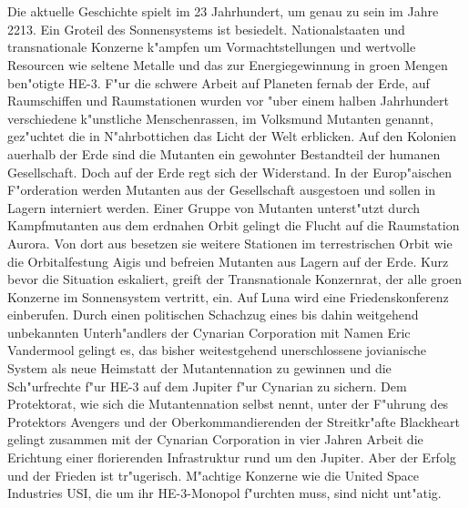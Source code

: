\section{\@introchaptername}

Die aktuelle Geschichte spielt im 23 Jahrhundert, um genau zu sein im Jahre 2213. Ein Gro\3teil des Sonnensystems ist besiedelt. Nationalstaaten und transnationale Konzerne k"ampfen um Vormachtstellungen und wertvolle Resourcen wie seltene Metalle und das zur Energiegewinnung in gro\3en Mengen ben"otigte HE-3. F"ur die schwere Arbeit auf Planeten fernab der Erde, auf Raumschiffen und Raumstationen wurden vor "uber einem halben Jahrhundert verschiedene k"unstliche Menschenrassen, im Volksmund Mutanten genannt, gez"uchtet die in N"ahrbottichen das Licht der Welt erblicken. Auf den Kolonien au\3erhalb der Erde sind die Mutanten ein gewohnter Bestandteil der humanen Gesellschaft. Doch auf der Erde regt sich der Widerstand. In der Europ"aischen F"orderation werden Mutanten aus der Gesellschaft ausgesto\3en und sollen in Lagern interniert werden. Einer Gruppe von Mutanten unterst"utzt durch Kampfmutanten aus dem erdnahen Orbit gelingt die Flucht auf die Raumstation Aurora. Von dort aus besetzen sie weitere Stationen im terrestrischen Orbit wie die Orbitalfestung Aigis und befreien Mutanten aus Lagern auf der Erde. Kurz bevor die Situation eskaliert, greift der Transnationale Konzernrat, der alle gro\3en Konzerne im Sonnensystem vertritt, ein. Auf Luna wird eine Friedenskonferenz einberufen. Durch einen politischen Schachzug eines bis dahin weitgehend unbekannten Unterh"andlers der Cynarian Corporation mit Namen Eric Vandermool gelingt es, das bisher weitestgehend unerschlossene jovianische System als neue Heimstatt der Mutantennation zu gewinnen und die Sch"urfrechte f"ur HE-3 auf dem Jupiter f"ur Cynarian zu sichern. Dem Protektorat, wie sich die Mutantennation selbst nennt, unter der F"uhrung des Protektors Avengers und der Oberkommandierenden der Streitkr"afte Blackheart gelingt zusammen mit der Cynarian Corporation in vier Jahren Arbeit die Erichtung einer florierenden Infrastruktur rund um den Jupiter. Aber der Erfolg und der Frieden ist tr"ugerisch. M"achtige Konzerne wie die United Space Industries USI, die um ihr HE-3-Monopol f"urchten muss, sind nicht unt"atig.